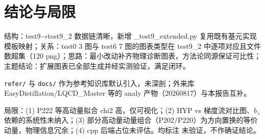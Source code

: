 \documentclass[UTF8]{ctexart}
\begin{document}
\section{结论与局限}
\begin{conclbox}
结构：test9→test9\_2 数据链清晰，新增 \_test9\_extended.py 复用既有基元实现模板映射；关系：test0 3 图与 test6 7 图的图表类型在 test9\_2 中逐项对应且文件数超集（120 png）；思路：最小改动补齐物理诊断图表，方法论同源保证可比性；主题结论：扩展图表已全部生成并经实测验证，满足闭环。
\end{conclbox}
\begin{refbox}
\texttt{refer/} 与 \texttt{docs/} 作为参考知识库默认引入，未深剖；外来库 EasyDistillation/LQCD\_Master 等的 analy 产物（20260817）与本报告互补。
\end{refbox}
\begin{warnbox}
局限：(1) P222 等高动量拟合 chi2 高，仅可视化；(2) HYP vs 梯度流对比图、$b_{\perp}$ 依赖的系统性未纳入；(3) 部分高动量动量组合（P202/P220）为方向置换的等价动量，物理信息冗余；(4) cpp 后端占位未评估。均标注 \textcolor{warn}{未验证}，不作确证结论。
\end{warnbox}
\end{document}
